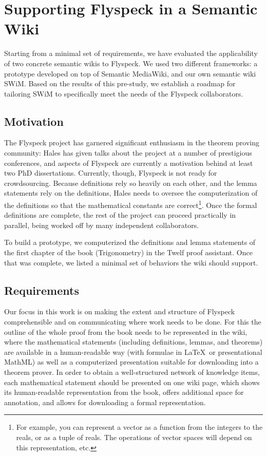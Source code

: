 
\section{Supporting Flyspeck in a Semantic Wiki}

Starting from a minimal set of requirements, we have evaluated the
applicability of two concrete semantic wikis to Flyspeck.  We used two
different frameworks: a prototype developed on top of Semantic
MediaWiki, and our own semantic wiki SWiM.  Based on the results of
this pre-study, we establish a roadmap for tailoring SWiM to
specifically meet the needs of the Flyspeck collaborators.

\subsection{Motivation}
\label{sec:req}

The Flyspeck project has garnered significant enthusiasm in the theorem proving
community: Hales has given talks about the project at a number of prestigious
conferences, and aspects of Flyspeck are currently a motivation behind at least
two PhD dissertations.  Currently, though, Flyspeck is not ready for
crowdsourcing.  Because definitions rely so heavily on each other, and the lemma
statements rely on the definitions, Hales needs to oversee the computerization
of the definitions so that the mathematical constants are correct\footnote{For
  example, you can represent a vector as a function from the integers to the
  reals, or as a tuple of reals.  The operations of vector spaces will depend on
  this representation, etc.}.  Once the formal definitions are complete, the
rest of the project can proceed practically in parallel, being worked off by
many independent collaborators.

To build a prototype, we computerized the definitions and lemma statements of
the first chapter of the book (Trigonometry) in the
Twelf\cite{Schurmann:1999:Twelf} proof assistant.  Once that was complete, we
listed a minimal set of behaviors the wiki should support.

\subsection{Requirements}

Our focus in this work is on making the extent and structure of
Flyspeck comprehensible and on communicating where work needs to be
done.  For this the outline of the whole proof from the
book\cite{Hales:2007:FlyspeckBook} needs to be represented in the
wiki, where the mathematical statements (including definitions,
lemmas, and theorems) are available in a human-readable way (with
formulae in \LaTeX\ or presentational MathML) as well as a
computerized presentation suitable for downloading into a theorem
prover.  In order to obtain a well-structured network of knowledge
items, each mathematical statement should be presented on one wiki
page, which shows its human-readable representation from the book,
offers additional space for annotation, and allows for downloading a
formal representation.  

